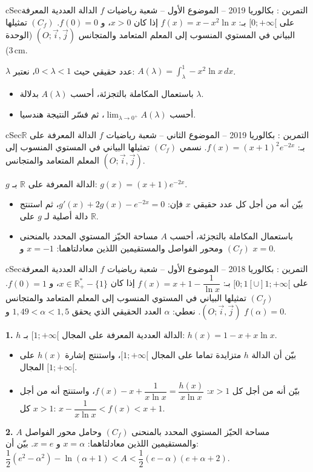 \documentclass[12pt,a4paper]{article}
\newenvironment{BOX}[2]{\begin{otherlanguage}{english}\begin{arbox}{#1}{#2}}{\end{arbox}\end{otherlanguage}}
\newcounter{exo}
\newenvironment{tamrin}[1]{\stepcounter{exo}\begin{BOX}{cSec}{التمرين \theexo: #1}}{\end{BOX}}
\newcommand{\R}{\mathbb{R}}
\newenvironment{sq}{\begin{itemize}[leftmargin=2.4em,itemsep=3pt]}{\end{itemize}}
\newcommand{\qa}{\item[(أ)]}\newcommand{\qb}{\item[(ب)]}\newcommand{\qc}{\item[(جـ)]}\newcommand{\qd}{\item[(د)]}\newcommand{\qe}{\item[(هـ)]}
\newcommand{\QQ}[1]{\par\smallskip\textbf{#1.} }
\begin{document}
\begin{tamrin}{بكالوريا 2019 -- الموضوع الأول -- شعبة رياضيات}
$f$ الدالة العددية المعرفة على $[0;+\infty[$ بـ: $f(x)=x-x^2\ln x$ إذا كان $x>0$، و $f(0)=0$.
$(C_f)$ تمثيلها البياني في المستوي المنسوب إلى المعلم المتعامد والمتجانس $(O;\vec i,\vec j)$ (الوحدة $3\,\text{cm}$).

$\lambda$ عدد حقيقي حيث $0<\lambda<1$، نعتبر: $A(\lambda)=\displaystyle\int_{\lambda}^1-x^2\ln x\,dx$.
\begin{sq}
\qa باستعمال المكاملة بالتجزئة، أحسب $A(\lambda)$ بدلالة $\lambda$.
\qb أحسب $\displaystyle\lim_{\lambda\to0^+}A(\lambda)$، ثم فسّر النتيجة هندسيا.
\end{sq}
\end{tamrin}

\begin{tamrin}{بكالوريا 2019 -- الموضوع الثاني -- شعبة رياضيات}
$f$ الدالة المعرفة على $\R$ بـ: $f(x)=(x+1)^2e^{-2x}$. نسمي $(C_f)$ تمثيلها البياني في المستوي المنسوب إلى المعلم المتعامد والمتجانس $(O;\vec i,\vec j)$.

$g$ الدالة المعرفة على $\R$ بـ: $g(x)=(x+1)e^{-2x}$.
\begin{sq}
\qa بيّن أنه من أجل كل عدد حقيقي $x$ فإن: $g'(x)+2g(x)-e^{-2x}=0$، ثم استنتج دالة أصلية لـ $g$ على $\R$.
\qb باستعمال المكاملة بالتجزئة، أحسب $A$ مساحة الحيّز المستوي المحدد بالمنحنى $(C_f)$ ومحور الفواصل والمستقيمين اللذين معادلتاهما: $x=-1$ و $x=0$.
\end{sq}
\end{tamrin}

\begin{tamrin}{بكالوريا 2018 -- الموضوع الأول -- شعبة رياضيات}
$f$ الدالة العددية المعرفة على $[0;1[\cup]1;+\infty[$ بـ: $f(x)=x+1-\dfrac{1}{\ln x}$ إذا كان $x\in\R_+^*-\{1\}$، و $f(0)=1$.
$(C_f)$ تمثيلها البياني في المستوي المنسوب إلى المعلم المتعامد والمتجانس $(O;\vec i,\vec j)$.
نعطي: $\alpha$ العدد الحقيقي الذي يحقق $1{,}49<\alpha<1{,}5$ و $f(\alpha)=0$.
\QQ{1} $h$ الدالة العددية المعرفة على المجال $[1;+\infty[$ بـ: $h(x)=1-x+x\ln x$.
\begin{sq}
\qa بيّن أن الدالة $h$ متزايدة تماما على المجال $[1;+\infty[$، واستنتج إشارة $h(x)$ على المجال $[1;+\infty[$.
\qb بيّن أنه من أجل كل $x>1$: $f(x)-x+\dfrac{1}{x\ln x}=\dfrac{h(x)}{x\ln x}$، واستنتج أنه من أجل كل $x>1$: $x-\dfrac{1}{x\ln x}<f(x)<x+1$.
\end{sq}
\QQ{2} $A$ مساحة الحيّز المستوي المحدد بالمنحنى $(C_f)$ وحامل محور الفواصل والمستقيمين اللذين معادلتاهما: $x=\alpha$ و $x=e$.
بيّن أن: $\dfrac12(e^2-\alpha^2)-\ln(\alpha+1)<A<\dfrac12(e-\alpha)(e+\alpha+2)$.
\end{tamrin}
\end{document}
